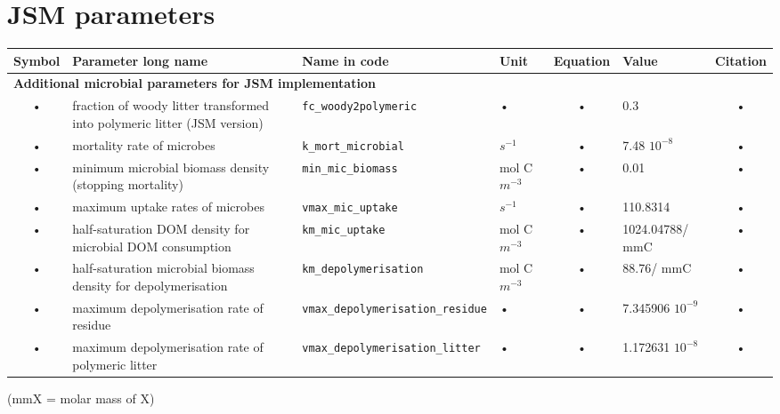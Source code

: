  
\begin{table}
\section{JSM parameters}\label{tab:sb:jsm}
\begin{tabularx}{\linewidth}{|c|X|l|l|c|l|c|} %
\hline 
Symbol & Parameter long name & Name in code & Unit & Equation & Value & Citation \\ 
\hline 

\multicolumn{6}{l}{\bf Additional microbial parameters for JSM implementation}\\
\hline
• & fraction of woody litter transformed into polymeric litter (JSM version) & \texttt{fc\_woody2polymeric} & • & • & 0.3 & • \\
• & mortality rate of microbes & \texttt{k\_mort\_microbial} & $s^{-1}$ & • & 7.48 $10^{-8}$ & • \\
• & minimum microbial biomass density (stopping mortality) & \texttt{min\_mic\_biomass} & mol C $m^{-3}$ & • & 0.01 & • \\
• & maximum uptake rates of microbes & \texttt{vmax\_mic\_uptake} & $s^{-1}$ & • & 110.8314 & • \\
• & half-saturation DOM density for microbial DOM consumption & \texttt{km\_mic\_uptake} & mol C $m^{-3}$ & • & 1024.04788/ mmC & • \\
• & half-saturation microbial biomass density for depolymerisation & \texttt{km\_depolymerisation} & mol C $m^{-3}$ & • & 88.76/ mmC & • \\
• & maximum depolymerisation rate of residue & \texttt{vmax\_depolymerisation\_residue} & • & • & 7.345906 $10^{-9}$ & • \\
• & maximum depolymerisation rate of polymeric litter & \texttt{vmax\_depolymerisation\_litter} & • & • & 1.172631 $10^{-8}$ & • \\
\hline 
\end{tabularx}
(mmX = molar mass of X)
\end{table}


